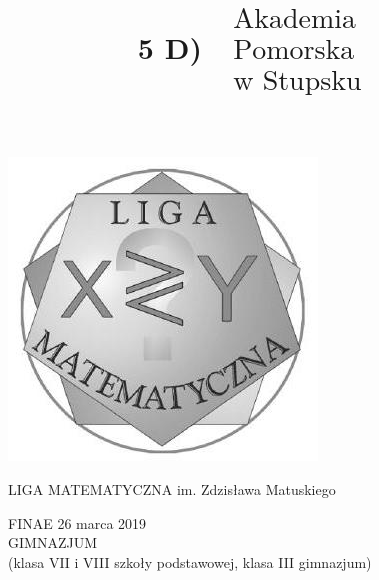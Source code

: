 \documentclass[10pt]{article}
\title{5 D) \(\begin{gathered}\text { Akademia } \\ \text { Pomorska } \\ \text { w Stupsku }\end{gathered}\) }
\author{}
\date{}
\begin{document}
\maketitle
\begin{center}
\includegraphics[max width=\textwidth]{2024_11_21_7f0a65778be44e58ebeag-1}
\end{center}

LIGA MATEMATYCZNA im. Zdzisława Matuskiego

FINAE 26 marca 2019\\
GIMNAZJUM\\
(klasa VII i VIII szkoły podstawowej, klasa III gimnazjum)
\end{document}
